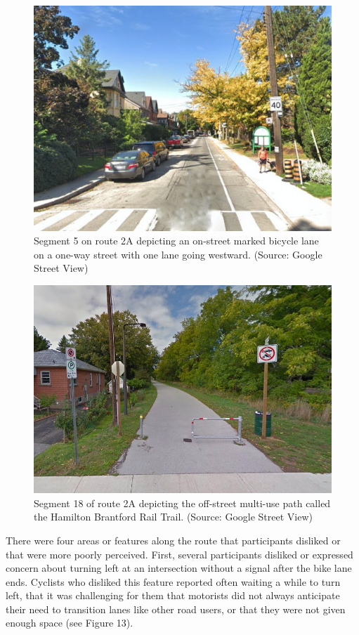 \documentclass[]{elsarticle} %
\begin{document}
\begin{figure}

{\centering \includegraphics[width=0.65\linewidth]{Figure 11} 

}

\caption{Segment 5 on route 2A depicting an on-street marked bicycle lane on a one-way street with one lane going westward. (Source: Google Street View)}\label{fig:figure-11}
\end{figure}

\begin{figure}

{\centering \includegraphics[width=0.65\linewidth]{Figure 12} 

}

\caption{Segment 18 of route 2A depicting the off-street multi-use path called the Hamilton Brantford Rail Trail. (Source: Google Street View)}\label{fig:figure-12}
\end{figure}

There were four areas or features along the route that participants
disliked or that were more poorly perceived. First, several participants
disliked or expressed concern about turning left at an intersection
without a signal after the bike lane ends. Cyclists who disliked this
feature reported often waiting a while to turn left, that it was
challenging for them that motorists did not always anticipate their need
to transition lanes like other road users, or that they were not given
enough space (see Figure 13).
\end{document}
